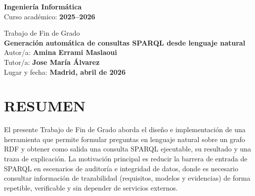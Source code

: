 \documentclass[12pt,a4paper]{article}
\newcommand{\tfgDegree}{\textbf{Ingeniería Informática}}
\newcommand{\tfgAcademicYear}{Curso académico: \textbf{2025--2026}}
\newcommand{\tfgTitle}{\textbf{Generación automática de consultas SPARQL desde lenguaje natural}}
\newcommand{\tfgAuthor}{Autor/a: \textbf{Amina Errami Maslaoui}}
\newcommand{\tfgSupervisor}{Tutor/a: \textbf{Jose María Álvarez}}
\newcommand{\tfgPlaceDate}{Lugar y fecha: \textbf{Madrid, abril de 2026}}
\begin{document}
\justifying
{}
\setlength{\parskip}{6pt}
\setlength{\parindent}{0pt}

\setcounter{secnumdepth}{0}

\setcounter{page}{1}

\begin{titlepage}
\thispagestyle{empty}
\begin{center}
\vspace*{1.5cm}

{\Large \tfgDegree \\
\vspace{0.2cm}
\tfgAcademicYear}

\vspace{2.0cm}
{\LARGE Trabajo de Fin de Grado}\\
\vspace{0.8cm}
{\Huge \tfgTitle}\\

\vfill
{\large \tfgAuthor}\\
\vspace{0.2cm}
{\large \tfgSupervisor}\\
\vspace{0.8cm}
{\large \tfgPlaceDate}\\


\end{center}
\end{titlepage}

\clearpage
\thispagestyle{empty}
\null
\clearpage

\thispagestyle{plain}
\section*{RESUMEN}
\noindent
El presente Trabajo de Fin de Grado aborda el diseño e implementación de una herramienta que permite formular preguntas en lenguaje natural sobre un grafo RDF y obtener como salida una consulta SPARQL ejecutable, su resultado y una traza de explicación. La motivación principal es reducir la barrera de entrada de SPARQL en escenarios de auditoría e integridad de datos, donde es necesario consultar información de trazabilidad (requisitos, modelos y evidencias) de forma repetible, verificable y sin depender de servicios externos.
\end{document}
